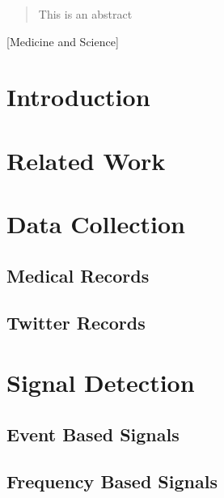 \documentclass{acm_proc_article-sp}
\begin{document}
\maketitle
\begin{abstract}
This is an abstract
\end{abstract}

[Medicine and Science]



\section{Introduction}

\section{Related Work}

\section{Data Collection}
\subsection{Medical Records}
\subsection{Twitter Records}

\section{Signal Detection}
\subsection{Event Based Signals}
\subsection{Frequency Based Signals}
\end{document}
